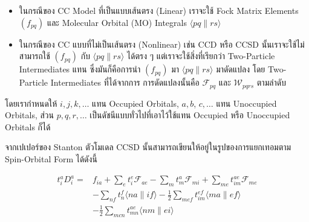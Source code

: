 \begin{itemize}[topsep=0pt,noitemsep]
  \setlength\itemsep{1em}
  \item ในกรณีของ CC Model ที่เป็นแบบเส้นตรง (Linear) เราจะใช้ Fock Matrix Elements
        $\left(f_{p q}\right)$ และ Molecular Orbital (MO) Integrals $\langle p q \| r s\rangle$

  \item ในกรณีของ CC แบบที่ไม่เป็นเส้นตรง (Nonlinear) เช่น CCD หรือ CCSD นั้นเราจะใช้ไม่สามารถใช้ $\left(f_{p q}\right)$
        กับ $\langle p q \| r s\rangle$ ได้ตรง ๆ แต่เราจะใช้สิ่งที่เรียกว่า Two-Particle Intermediates แทน ซึ่งมันก็คือการนำ
        $\left(f_{p q}\right)$ มา $\langle p q \| r s\rangle$ มาดัดแปลง โดย Two-Particle Intermediates ที่ได้จากการ%
        การดัดแปลงนั้นคือ $\mathscr{F}_{p q}$ และ $\mathscr{W}_{p q r s}$ ตามลำดับ
\end{itemize}

\noindent โดยเรากำหนดให้ $i, j, k, \ldots$ แทน Occupied Orbitals, $a, b$, $c, \ldots$ แทน Unoccupied Orbitals,
ส่วน $p, q, r, \ldots$ เป็นดัชนีแบบทั่วไปที่เอาไว้ใช้แทน Occupied หรือ Unoccupied Orbitals ก็ได้

จากเปเปอร์ของ Stanton ตัวโมเดล CCSD นั้นสามารถเขียนให้อยู่ในรูปของการแยกเทอมตาม Spin-Orbital Form ได้ดังนี้

\noindent {}

\begin{equation}
  \label{eq:singles_cluster_operator}
  \begin{aligned}
    t_i^a D_i^a
    =
     & f_{i a} + \sum_e t_i^e \mathscr{F}_{a e} - \sum_m t_m^a \mathscr{F}_{m i}
    + \sum_{m e} t_{i m}^{a e} \mathscr{F}_{m e}                                                                     \\
     & - \sum_{n f} t_n^f\langle n a \| i f\rangle - \frac{1}{2} \sum_{m e f} t_{i m}^{e f}\langle m a \| e f\rangle \\
     & - \frac{1}{2} \sum_{m c n} t_{m n}^{a e}\langle n m \| e i\rangle
  \end{aligned}
\end{equation}

\noindent {}

